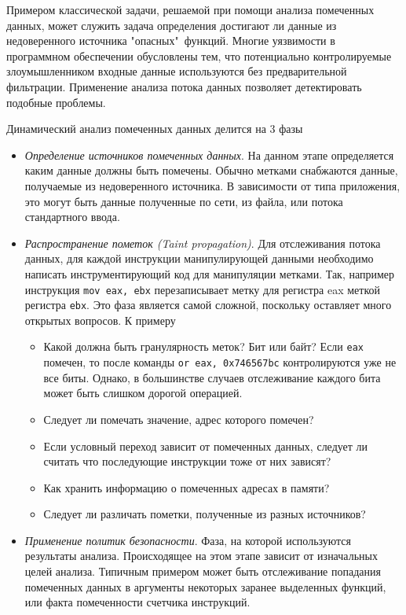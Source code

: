 Примером классической задачи, решаемой при помощи анализа помеченных данных, может служить задача определения достигают ли данные из недоверенного источника "опасных"\ функций. Многие уязвимости в программном обеспечении обусловлены тем, что потенциально контролируемые злоумышленником входные данные используются без предварительной фильтрации. Применение анализа потока данных позволяет детектировать подобные проблемы.

Динамический анализ помеченных данных делится на 3 фазы

    \begin{itemize}
        \item {\em Определение источников помеченных данных}. На данном этапе определяется каким данные должны быть помечены. Обычно метками снабжаются данные, получаемые из недоверенного
        источника. В зависимости от типа приложения, это могут быть данные полученные по сети, из файла, или потока стандартного ввода.
        \item {\em Распространение пометок (Taint propagation)}. Для отслеживания потока данных, 
        для каждой инструкции манипулирующей данными необходимо написать инструментирующий код для манипуляции метками. Так, например инструкция \texttt{mov eax, ebx} перезаписывает метку для регистра eax меткой регистра \texttt{ebx}. Это фаза является самой сложной, поскольку оставляет много открытых вопросов. К примеру
        \begin{itemize}
            \item Какой должна быть гранулярность меток? Бит или байт? Если \texttt{eax} помечен, то после команды \texttt{or eax, 0x746567bc} контролируются уже не все биты. Однако, в большинстве случаев отслеживание каждого бита может быть слишком дорогой операцией.
            \item Следует ли помечать значение, адрес которого помечен?
            \item Если условный переход зависит от помеченных данных, следует ли считать что последующие инструкции тоже от них зависят?
            \item Как хранить информацию о помеченных адресах в памяти?
            \item Следует ли различать пометки, полученные из разных источников?
        \end{itemize}
        \item {\em Применение политик безопасности}. Фаза, на которой используются результаты анализа. Происходящее на этом этапе зависит от изначальных целей анализа. Типичным примером может быть отслеживание попадания помеченных данных в аргументы некоторых заранее выделенных функций, или факта помеченности счетчика инструкций.
    \end{itemize}

